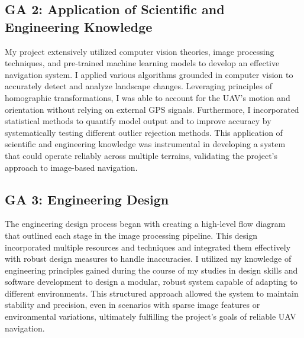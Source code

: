 \subsection*{GA 2: Application of Scientific and Engineering Knowledge}
My project extensively utilized computer vision theories, image processing techniques, and pre-trained machine learning models to develop an effective navigation system. I applied various algorithms grounded in computer vision to accurately detect and analyze landscape changes. Leveraging principles of homographic transformations, I was able to account for the UAV’s motion and orientation without relying on external GPS signals. Furthermore, I incorporated statistical methods to quantify model output and to improve accuracy by systematically testing different outlier rejection methods. This application of scientific and engineering knowledge was instrumental in developing a system that could operate reliably across multiple terrains, validating the project’s approach to image-based navigation.

\subsection*{GA 3: Engineering Design}
The engineering design process began with creating a high-level flow diagram that outlined each stage in the image processing pipeline. This design incorporated multiple resources and techniques and integrated them effectively with robust design measures to handle inaccuracies. I utilized my knowledge of engineering principles gained during the course of my studies in design skills and software development to design a modular, robust system capable of adapting to different environments. This structured approach allowed the system to maintain stability and precision, even in scenarios with sparse image features or environmental variations, ultimately fulfilling the project's goals of reliable UAV navigation.

